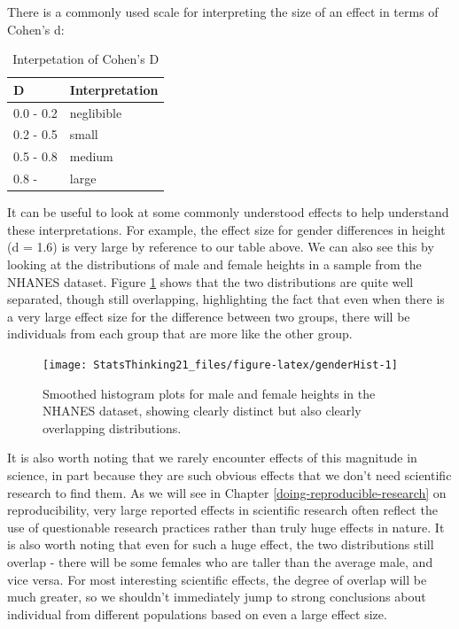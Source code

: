 \documentclass[12pt,]{book}
\theoremstyle{definition}
\theoremstyle{definition}
\theoremstyle{definition}
\theoremstyle{remark}
\begin{document}
There is a commonly used scale for interpreting the size of an effect in terms of Cohen's d:

\begin{table}

\caption{\label{tab:unnamed-chunk-53}Interpetation of Cohen's D}
\centering
\begin{tabular}[t]{l|l}
\hline
D & Interpretation\\
\hline
0.0 - 0.2 & neglibible\\
\hline
0.2 - 0.5 & small\\
\hline
0.5 - 0.8 & medium\\
\hline
0.8 - & large\\
\hline
\end{tabular}
\end{table}

It can be useful to look at some commonly understood effects to help understand these interpretations. For example, the effect size for gender differences in height (d = 1.6) is very large by reference to our table above. We can also see this by looking at the distributions of male and female heights in a sample from the NHANES dataset. Figure \ref{fig:genderHist} shows that the two distributions are quite well separated, though still overlapping, highlighting the fact that even when there is a very large effect size for the difference between two groups, there will be individuals from each group that are more like the other group.

\begin{figure}
\texttt{[image: StatsThinking21\_files/figure-latex/genderHist-1]} \caption{Smoothed histogram plots for male and female heights in the NHANES dataset, showing clearly distinct but also clearly overlapping distributions.}\label{fig:genderHist}
\end{figure}

It is also worth noting that we rarely encounter effects of this magnitude in science, in part because they are such obvious effects that we don't need scientific research to find them. As we will see in Chapter \ref{doing-reproducible-research} on reproducibility, very large reported effects in scientific research often reflect the use of questionable research practices rather than truly huge effects in nature. It is also worth noting that even for such a huge effect, the two distributions still overlap - there will be some females who are taller than the average male, and vice versa. For most interesting scientific effects, the degree of overlap will be much greater, so we shouldn't immediately jump to strong conclusions about individual from different populations based on even a large effect size.
\end{document}

